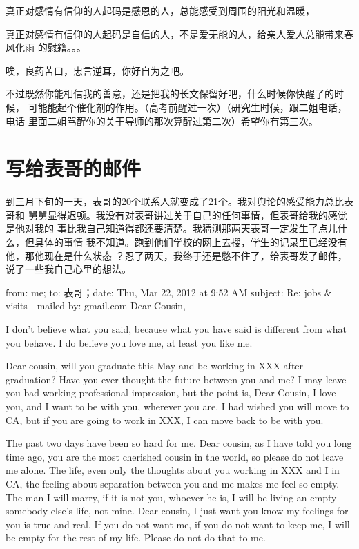 \documentclass[12pt]{book}
\begin{document}
真正对感情有信仰的人起码是感恩的人，总能感受到周围的阳光和温暖，

真正对感情有信仰的人起码是自信的人，不是爱无能的人，给亲人爱人总能带来春风化雨
的慰籍。。。

唉，良药苦口，忠言逆耳，你好自为之吧。

不过既然你能相信我的善意，还是把我的长文保留好吧，什么时候你快醒了的时候，
可能能起个催化剂的作用。（高考前醒过一次）（研究生时候，跟二姐电话，电话
里面二姐骂醒你的关于导师的那次算醒过第二次）希望你有第三次。
\section{写给表哥的邮件}
\label{sec-9-68}

到三月下旬的一天，表哥的20个联系人就变成了21个。我对舆论的感受能力总比表哥和
舅舅显得迟顿。我没有对表哥讲过关于自己的任何事情，但表哥给我的感觉是他对我的
事比我自己知道得都还要清楚。我猜测那两天表哥一定发生了点儿什么，但具体的事情
我不知道。跑到他们学校的网上去搜，学生的记录里已经没有他，那他现在是什么状态
？忍了两天，我终于还是憋不住了，给表哥发了邮件，说了一些我自己心里的想法。

from: me;  to: 表哥；date: Thu, Mar 22, 2012 at 9:52 AM
subject: Re: jobs \& visits　mailed-by: gmail.com
Dear Cousin,

I don't believe what you said, because what you have said is different from 
what you behave. I do believe you love me, at least you like me.

Dear cousin, will you graduate this May and be working in XXX after 
graduation? Have you ever thought the future between you and me? I may leave
you bad working professional impression, but the point is, Dear Cousin, I 
love you, and I want to be with you, wherever you are. I had wished you will
move to CA, but if you are going to work in XXX, I can move back to be with
you. 

The past two days have been so hard for me. Dear cousin, as I have told you 
long time ago, you are the most cherished cousin in the world, so please do 
not leave me alone. The life, even only the thoughts about you working in 
XXX and I in CA, the feeling about separation between you and me makes me 
feel so empty. The man I will marry, if it is not you, whoever he is, I will
be living an empty somebody else's life, not mine. Dear cousin, I just want
you know my feelings for you is true and real. If you do not want me, if 
you do not want to keep me, I will be empty for the rest of my life. Please 
do not do that to me. 
\end{document}
